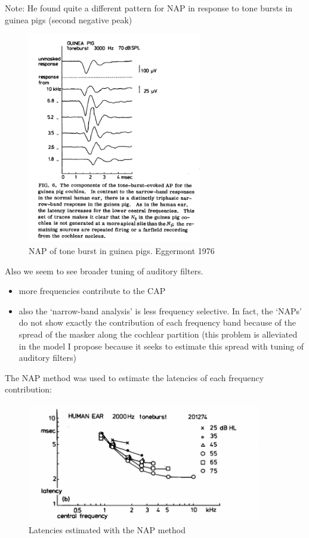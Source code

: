 \documentclass[]{article}
\providecommand{\tightlist}{%
  \setlength{\itemsep}{0pt}\setlength{\parskip}{0pt}}
\begin{document}
\clearpage

Note: He found quite a different pattern for NAP in response to tone
bursts in guinea pigs (second negative peak)

\begin{figure}
\centering
\includegraphics[width=3in,height=\textheight]{./figures/NAP_tone_guinea.png}
\caption{NAP of tone burst in guinea pigs. Eggermont 1976}
\end{figure}

Also we seem to see broader tuning of auditory filters.

\begin{itemize}
\tightlist
\item
  more frequencies contribute to the CAP
\item
  also the `narrow-band analysis' is less frequency selective. In fact,
  the `NAPs' do not show exactly the contribution of each frequency band
  because of the spread of the masker along the cochlear partition (this
  problem is alleviated in the model I propose because it seeks to
  estimate this spread with tuning of auditory filters)
\end{itemize}

\clearpage

The NAP method was used to estimate the latencies of each frequency
contribution:

\begin{figure}
\centering
\includegraphics[width=4in,height=\textheight]{./figures/NAP_tone_latencies.png}
\caption{Latencies estimated with the NAP method}
\end{figure}
\end{document}
